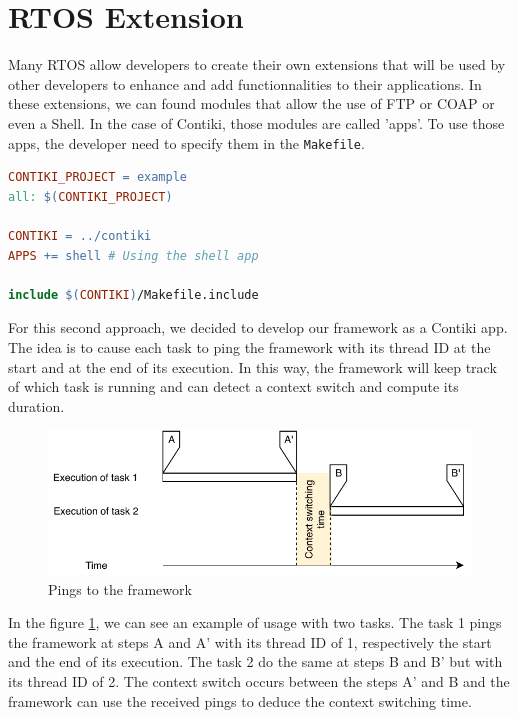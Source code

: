 \section{RTOS Extension \label{sec:extension}}

Many RTOS allow developers to create their own extensions that will be used by other developers to enhance and add functionnalities to their applications.
In these extensions, we can found modules that allow the use of FTP or COAP or even a Shell.
In the case of Contiki, those modules are called 'apps'.
To use those apps, the developer need to specify them in the \texttt{Makefile}.

\begin{lstlisting}[style=CStyle, language=make, caption=Example of Makefile using the app \texttt{shell} with Contiki]
CONTIKI_PROJECT = example
all: $(CONTIKI_PROJECT)

CONTIKI = ../contiki
APPS += shell # Using the shell app

include $(CONTIKI)/Makefile.include
\end{lstlisting}

For this second approach, we decided to develop our framework as a Contiki app.
The idea is to cause each task to ping the framework with its thread ID at the start and at the end of its execution.
In this way, the framework will keep track of which task is running and can detect a context switch and compute its duration.

\begin{figure}[!ht]
  \centering
  \includegraphics[scale=1]{assets/internal-framework-ping.pdf}
  \caption{\label{fig:internal-framework-ping}Pings to the framework}
\end{figure}

In the figure \ref{fig:internal-framework-ping}, we can see an example of usage with two tasks.
The task 1 pings the framework at steps A and A' with its thread ID of 1, respectively the start and the end of its execution.
The task 2 do the same at steps B and B' but with its thread ID of 2.
The context switch occurs between the steps A' and B and the framework can use the received pings to deduce the context switching time.

